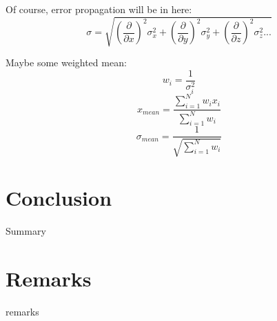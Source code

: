 \documentclass[oneside,letterpaper]{article}   	%
\begin{document}
Of course, error propagation will be in here:
\begin{equation}  \sigma = \sqrt{\left(\frac{\partial}{\partial x}\right)^2\sigma _x^2+\left(\frac{\partial}{\partial y}\right)^2\sigma _y^2 + \left(\frac{\partial}{\partial z}\right)^2\sigma _z^2...} \end{equation}

Maybe some weighted mean:
\begin{equation} w_i = \frac{1}{\sigma_i^2}  \end{equation}
\begin{equation} x_{mean} = \frac{\sum\limits_{i=1}^N{w_ix_i}}{\sum\limits_{i=1}^N{w_i}} \end{equation}
\begin{equation} \sigma_{mean} = \frac{1}{\sqrt{\sum\limits_{i=1}^N{w_i}}} \end{equation}


\section{Conclusion}
Summary



\section{Remarks}
remarks
\end{document}
